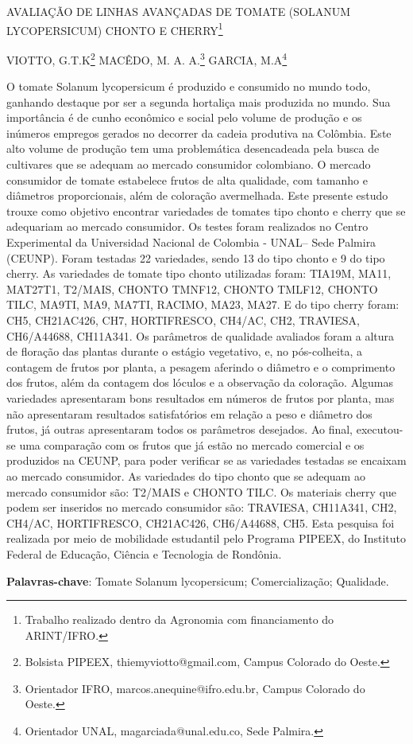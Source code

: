 \documentclass[article,12pt,onesidea,4paper,english,brazil]{abntex2}
\begin{document}
	
	
	\frenchspacing 
	
	\begin{center}
		\LARGE AVALIAÇÃO DE LINHAS AVANÇADAS DE TOMATE (SOLANUM
		LYCOPERSICUM) CHONTO E CHERRY\footnote{Trabalho realizado dentro da Agronomia com financiamento do ARINT/IFRO.}
		
		\normalsize
		VIOTTO, G.T.K\footnote{Bolsista PIPEEX, thiemyviotto@gmail.com, Campus Colorado do Oeste.} 
		MACÊDO, M. A. A.\footnote{Orientador IFRO, marcos.anequine@ifro.edu.br, Campus Colorado do Oeste.} 
		GARCIA, M.A\footnote{Orientador UNAL, magarciada@unal.edu.co, Sede Palmira.} 
	\end{center}
	
	\noindent O tomate Solanum lycopersicum é produzido e consumido no mundo todo, ganhando destaque por
	ser a segunda hortaliça mais produzida no mundo. Sua importância é de cunho econômico e social
	pelo volume de produção e os inúmeros empregos gerados no decorrer da cadeia produtiva na
	Colômbia. Este alto volume de produção tem uma problemática desencadeada pela busca de
	cultivares que se adequam ao mercado consumidor colombiano. O mercado consumidor de tomate
	estabelece frutos de alta qualidade, com tamanho e diâmetros proporcionais, além de coloração
	avermelhada. Este presente estudo trouxe como objetivo encontrar variedades de tomates tipo
	chonto e cherry que se adequariam ao mercado consumidor. Os testes foram realizados no Centro
	Experimental da Universidad Nacional de Colombia - UNAL– Sede Palmira (CEUNP). Foram testadas
	22 variedades, sendo 13 do tipo chonto e 9 do tipo cherry. As variedades de tomate tipo chonto
	utilizadas foram: TIA19M, MA11, MAT27T1, T2/MAIS, CHONTO TMNF12, CHONTO TMLF12, CHONTO
	TILC, MA9TI, MA9, MA7TI, RACIMO, MA23, MA27. E do tipo cherry foram: CH5, CH21AC426, CH7,
	HORTIFRESCO, CH4/AC, CH2, TRAVIESA, CH6/A44688, CH11A341. Os parâmetros de qualidade
	avaliados foram a altura de floração das plantas durante o estágio vegetativo, e, no pós-colheita, a
	contagem de frutos por planta, a pesagem aferindo o diâmetro e o comprimento dos frutos, além da
	contagem dos lóculos e a observação da coloração. Algumas variedades apresentaram bons
	resultados em números de frutos por planta, mas não apresentaram resultados satisfatórios em
	relação a peso e diâmetro dos frutos, já outras apresentaram todos os parâmetros desejados. Ao
	final, executou-se uma comparação com os frutos que já estão no mercado comercial e os
	produzidos na CEUNP, para poder verificar se as variedades testadas se encaixam ao mercado
	consumidor. As variedades do tipo chonto que se adequam ao mercado consumidor são: T2/MAIS e
	CHONTO TILC. Os materiais cherry que podem ser inseridos no mercado consumidor são: TRAVIESA,
	CH11A341, CH2, CH4/AC, HORTIFRESCO, CH21AC426, CH6/A44688, CH5. Esta pesquisa foi realizada
	por meio de mobilidade estudantil pelo Programa PIPEEX, do Instituto Federal de Educação, Ciência e
	Tecnologia de Rondônia.
	
	\vspace{\onelineskip}
	
	\noindent
	\textbf{Palavras-chave}: Tomate Solanum lycopersicum; Comercialização; Qualidade.
	
\end{document}

